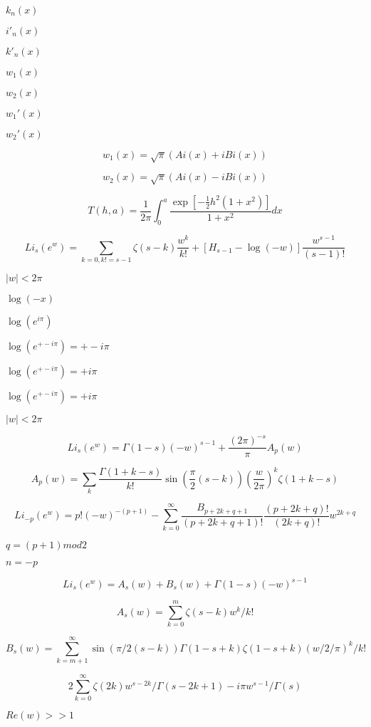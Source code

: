 \documentclass{article}
\begin{document}
$ k_n(x) $
\pagebreak

$ i'_n(x) $
\pagebreak

$ k'_n(x) $
\pagebreak

$ w_1(x) $
\pagebreak

$ w_2(x) $
\pagebreak

$ w_1'(x) $
\pagebreak

$ w_2'(x) $
\pagebreak

\[ w_1(x) = \sqrt{\pi}(Ai(x) + iBi(x)) \]
\pagebreak

\[ w_2(x) = \sqrt{\pi}(Ai(x) - iBi(x)) \]
\pagebreak

\[ T(h,a) = \frac{1}{2\pi}\int_0^a\frac{\exp[-\frac{1}{2}h^2(1+x^2)]}{1+x^2}dx \]
\pagebreak

\[ Li_s(e^w) = \sum_{k=0, k != s-1} \zeta(s-k) \frac{w^k}{k!} + \left[H_{s-1} - \log(-w)\right] \frac{w^{s-1}}{(s-1)!} \]
\pagebreak

$ |w| < 2 \pi $
\pagebreak

$ \log(-x) $
\pagebreak

$ \log(e^{i\pi}) $
\pagebreak

$ \log(e^{+-i\pi}) = +-i\pi $
\pagebreak

$ \log(e^{+- i\pi}) = +i \pi $
\pagebreak

$ \log(e^{+- i\pi}) = +i\pi $
\pagebreak

$ |w| < 2\pi $
\pagebreak

\[ Li_s(e^w) = \Gamma(1-s)(-w)^{s-1} + \frac{(2\pi)^{-s}}{\pi} A_p(w) \]
\pagebreak

\[ A_p(w) = \sum_k \frac{\Gamma(1+k-s)}{k!} \sin\left(\frac{\pi}{2} (s-k)\right) \left(\frac{w}{2\pi}\right)^k \zeta(1+k-s) \]
\pagebreak

\[ Li_{-p}(e^w) = p!(-w)^{-(p+1)} - \sum_{k=0}^{\infty} \frac{B_{p+2k+q+1}}{(p+2k+q+1)!} \frac{(p+2k+q)!}{(2k+q)!}w^{2k+q} \]
\pagebreak

$ q = (p+1) mod 2 $
\pagebreak

$ n = -p $
\pagebreak

\[ Li_s(e^w) = A_s(w) + B_s(w) + \Gamma(1-s)(-w)^{s-1} \]
\pagebreak

\[ A_s(w) = \sum_{k=0}^{m} \zeta(s-k)w^k/k! \]
\pagebreak

\[ B_s(w) = \sum_{k=m+1}^{\infty} \sin(\pi/2(s-k)) \Gamma(1-s+k)\zeta(1-s+k) (w/2/\pi)^k/k! \]
\pagebreak

\[ 2 \sum_{k=0}^{\infty} \zeta(2k) w^{s-2k}/\Gamma(s-2k+1) -i \pi w^{s-1}/\Gamma(s) \]
\pagebreak

$ Re(w) >> 1 $
\pagebreak
\end{document}
